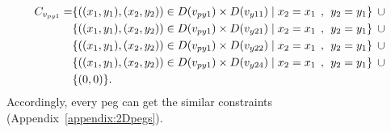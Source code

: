\begin{equation}
\begin{aligned}  
C_{v_{py1}} = &\{((x_{1},y_{1}),(x_{2},y_{2}))\in D(v_{py1}) \times D(v_{y11})\mid x_{2} = x_{1} \hspace{1ex} , \hspace{1ex}  y_{2} = y_{1}\}\hspace{1ex} \cup  
\\&\{((x_{1},y_{1}),(x_{2},y_{2}))\in D(v_{py1}) \times D(v_{y21})\mid x_{2} = x_{1} \hspace{1ex} , \hspace{1ex}  y_{2} = y_{1}\}\hspace{1ex} \cup 
\\&\{ ((x_{1},y_{1}),(x_{2},y_{2}))\in D(v_{py1}) \times D(v_{y22})\mid x_{2} = x_{1} \hspace{1ex} , \hspace{1ex}  y_{2} = y_{1}\}\hspace{1ex}\cup 
\\& \{((x_{1},y_{1}),(x_{2},y_{2}))\in D(v_{py1}) \times D(v_{y24})\mid x_{2} = x_{1} \hspace{1ex} , \hspace{1ex}  y_{2} = y_{1}\} \hspace{1ex}\cup
\\& \{(0,0)\}.
\end{aligned}
\end{equation}
Accordingly, every peg can get the similar constraints (Appendix~\ref{appendix:2Dpegs}).
\label{section:implementation1}

